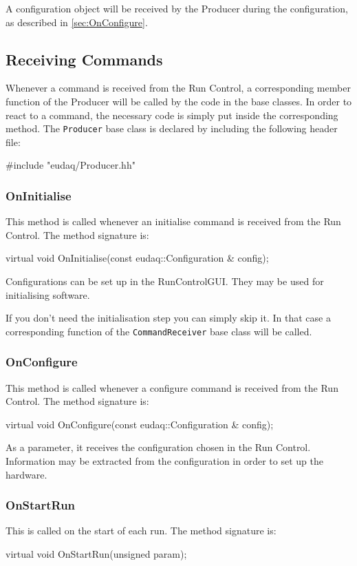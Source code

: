 A configuration object will be received by the Producer during the configuration,
as described in \autoref{sec:OnConfigure}.

\subsection{Receiving Commands}
Whenever a command is received from the Run Control,
a corresponding member function of the Producer will be called by the code in the base classes.
In order to react to a command, the necessary code is simply put inside the corresponding method.
The \texttt{Producer} base class is declared by including the following header file:
\begin{listing}
#include "eudaq/Producer.hh"
\end{listing}

\subsubsection{OnInitialise}
This method is called whenever an initialise command is received from the Run Control.
The method signature is:
\begin{listing}
virtual void OnInitialise(const eudaq::Configuration & config);
\end{listing}

Configurations can be set up in the RunControlGUI. They may be used for initialising software.

If you don't need the initialisation step you can simply skip it. In that case a corresponding function of the \texttt{CommandReceiver} base class will be called.

\subsubsection{OnConfigure}\label{sec:OnConfigure}
This method is called whenever a configure command is received from the Run Control.
The method signature is:
\begin{listing}
virtual void OnConfigure(const eudaq::Configuration & config);
\end{listing}

As a parameter, it receives the configuration chosen in the Run Control.
Information may be extracted from the configuration in order to set up the hardware.

\subsubsection{OnStartRun}
This is called on the start of each run.
The method signature is:
\begin{listing}
virtual void OnStartRun(unsigned param);
\end{listing}

